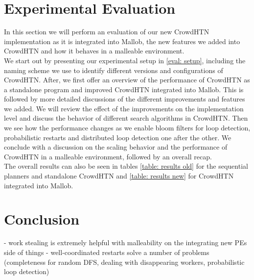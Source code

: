 \documentclass[enabledeprecatedfontcommands,12pt,a4paper,twoside]{scrartcl}
\numberwithin{equation}{section}
\begin{document}
\section{Experimental Evaluation}
\label{eval}
In this section we will perform an evaluation of our new CrowdHTN implementation as it is integrated into Mallob, the new features we added into CrowdHTN and how it behaves in a malleable environment. \\
We start out by presenting our experimental setup in \ref{eval: setup}, including the naming scheme we use to identify different versions and configurations of CrowdHTN. After, we first offer an overview of the performance of CrowdHTN as a standalone program and improved CrowdHTN integrated into Mallob.
This is followed by more detailed discussions of the different improvements and features we added. We will review the effect of the improvements on the implementation level and discuss the behavior of different search algorithms in CrowdHTN. Then we see how the performance changes as we enable bloom filters for loop detection, probabilistic restarts and distributed loop detection one after the other. We conclude with a discussion on the scaling behavior and the performance of CrowdHTN in a malleable environment, followed by an overall recap. \\
The overall results can also be seen in tables \ref{table: results old} for the sequential planners and standalone CrowdHTN and \ref{table: results new} for CrowdHTN integrated into Mallob.


\pagebreak
\section{Conclusion}
\label{conclusion}
- work stealing is extremely helpful with malleability on the integrating new PEs side of things
- well-coordinated restarts solve a number of problems (completeness for random DFS, dealing with disappearing workers, probabilistic loop detection)



\clearpage




\end{document}
